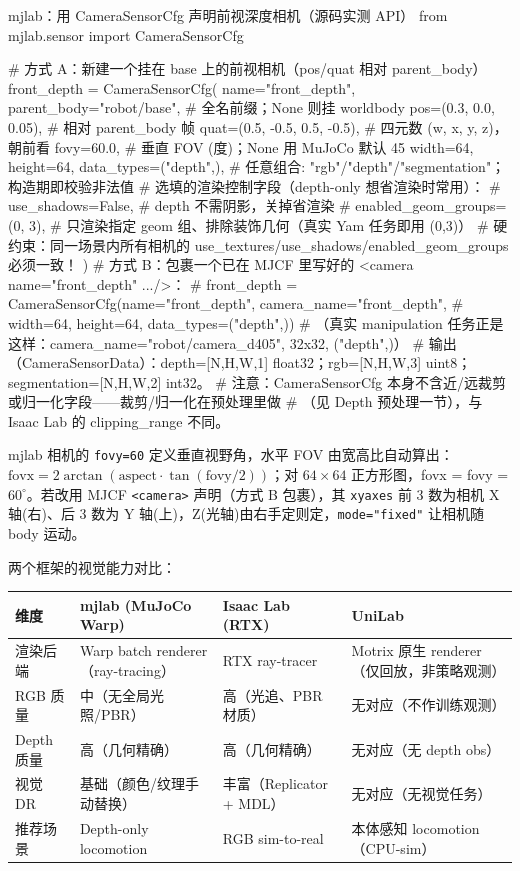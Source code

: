 \begin{codebox}[Python]{mjlab：用 CameraSensorCfg 声明前视深度相机（源码实测 API）}
from mjlab.sensor import CameraSensorCfg

# 方式 A：新建一个挂在 base 上的前视相机（pos/quat 相对 parent_body）
front_depth = CameraSensorCfg(
    name="front_depth",
    parent_body="robot/base",      # 全名前缀；None 则挂 worldbody
    pos=(0.3, 0.0, 0.05),          # 相对 parent_body 帧
    quat=(0.5, -0.5, 0.5, -0.5),   # 四元数 (w, x, y, z)，朝前看
    fovy=60.0,                      # 垂直 FOV (度)；None 用 MuJoCo 默认 45
    width=64, height=64,
    data_types=("depth",),         # 任意组合: "rgb"/"depth"/"segmentation"；构造期即校验非法值
    # 选填的渲染控制字段（depth-only 想省渲染时常用）：
    # use_shadows=False,           # depth 不需阴影，关掉省渲染
    # enabled_geom_groups=(0, 3),  # 只渲染指定 geom 组、排除装饰几何（真实 Yam 任务即用 (0,3)）
    # 硬约束：同一场景内所有相机的 use_textures/use_shadows/enabled_geom_groups 必须一致！
)
# 方式 B：包裹一个已在 MJCF 里写好的 <camera name="front_depth" .../>：
#   front_depth = CameraSensorCfg(name="front_depth", camera_name="front_depth",
#                                 width=64, height=64, data_types=("depth",))
#   （真实 manipulation 任务正是这样：camera_name="robot/camera_d405", 32x32, ("depth",)）
# 输出（CameraSensorData）：depth=[N,H,W,1] float32；rgb=[N,H,W,3] uint8；segmentation=[N,H,W,2] int32。
# 注意：CameraSensorCfg 本身不含近/远裁剪或归一化字段——裁剪/归一化在预处理里做
#       （见 Depth 预处理一节），与 Isaac Lab 的 clipping_range 不同。
\end{codebox}

mjlab 相机的 \verb|fovy=60| 定义垂直视野角，水平 FOV 由宽高比自动算出：$\text{fovx}=2\arctan(\text{aspect}\cdot\tan(\text{fovy}/2))$；对 $64\times64$ 正方形图，fovx = fovy = $60^\circ$。若改用 MJCF \verb|<camera>| 声明（方式 B 包裹），其 \verb|xyaxes| 前 3 数为相机 X 轴(右)、后 3 数为 Y 轴(上)，Z(光轴)由右手定则定，\verb|mode="fixed"| 让相机随 body 运动。

两个框架的视觉能力对比：

\begin{center}
\small
\begin{tabular}{@{}llll@{}}
\toprule
维度 & mjlab (MuJoCo Warp) & Isaac Lab (RTX) & UniLab \\
\midrule
渲染后端 & Warp batch renderer（ray-tracing） & RTX ray-tracer & Motrix 原生 renderer（仅回放，非策略观测） \\
RGB 质量 & 中（无全局光照/PBR） & 高（光追、PBR 材质） & 无对应（不作训练观测） \\
Depth 质量 & 高（几何精确） & 高（几何精确） & 无对应（无 depth obs） \\
视觉 DR & 基础（颜色/纹理手动替换） & 丰富（Replicator + MDL） & 无对应（无视觉任务） \\
推荐场景 & Depth-only locomotion & RGB sim-to-real & 本体感知 locomotion（CPU-sim） \\
\bottomrule
\end{tabular}
\end{center}

